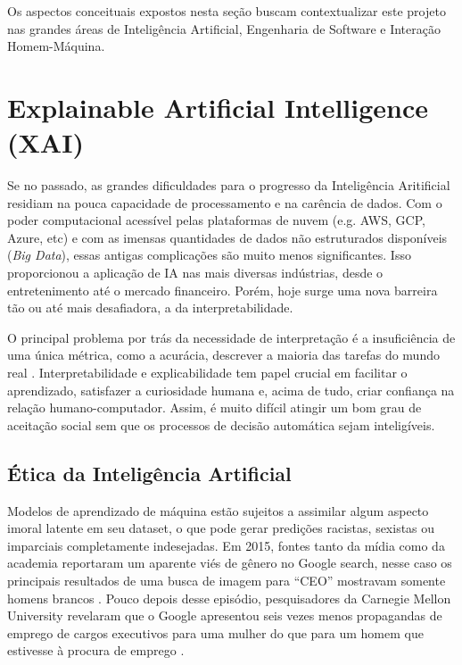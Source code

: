 \documentclass[]{politex}
\begin{document}
Os aspectos conceituais expostos nesta seção buscam contextualizar este projeto nas grandes áreas de Inteligência Artificial, Engenharia de Software e Interação Homem-Máquina. 

\section{Explainable Artificial Intelligence (XAI)}

Se no passado, as grandes dificuldades para o progresso da Inteligência Aritificial residiam na pouca capacidade de processamento e na carência de dados. Com o poder computacional acessível pelas plataformas de nuvem (e.g. AWS, GCP, Azure, etc) e com as imensas quantidades de dados não estruturados disponíveis (\textit{Big Data}), essas antigas complicações são muito menos significantes. Isso proporcionou a aplicação de IA nas mais diversas indústrias, desde o entretenimento até o mercado financeiro. Porém, hoje surge uma nova barreira tão ou até mais desafiadora, a da interpretabilidade.

O principal problema por trás da necessidade de interpretação é a insuficiência de uma única métrica, como a acurácia, descrever a maioria das tarefas do mundo real \cite{2017arXiv170208608D}. Interpretabilidade e explicabilidade tem papel crucial em facilitar o aprendizado, satisfazer a curiosidade humana \cite{molnar2019} e, acima de tudo, criar confiança na relação humano-computador. Assim, é muito difícil atingir um bom grau de aceitação social sem que os processos de decisão automática sejam inteligíveis.

\subsection{Ética da Inteligência Artificial}

Modelos de aprendizado de máquina estão sujeitos a assimilar algum aspecto imoral latente em seu dataset, o que pode gerar predições racistas, sexistas ou imparciais completamente indesejadas. Em 2015, fontes tanto da mídia como da academia reportaram um aparente viés de gênero no Google search, nesse caso os principais resultados de uma busca de imagem para “CEO” mostravam somente homens brancos \cite{Yapo-et-al2018}. Pouco depois desse episódio, pesquisadores da Carnegie Mellon University revelaram que o Google apresentou seis vezes menos propagandas de emprego de cargos executivos para uma mulher do que para um homem que estivesse à procura de emprego \cite{Yapo-et-al2018}. 
\end{document}
